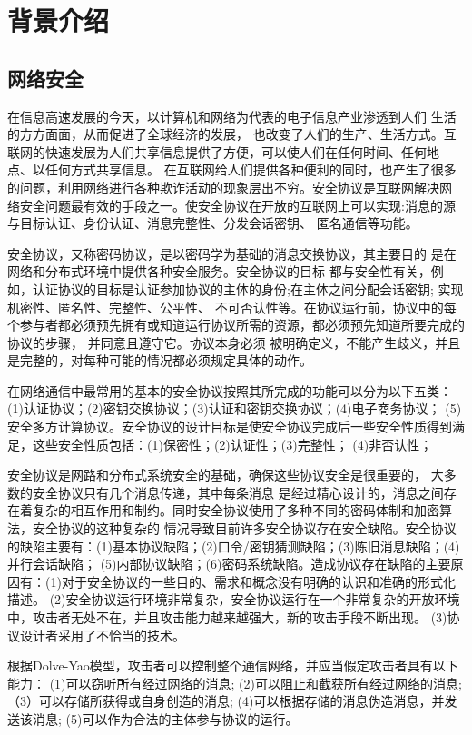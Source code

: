 \documentclass[UTF8]{ctexart}
\begin{document}
\section{背景介绍}
\subsection{网络安全}
\par{
	在信息高速发展的今天，以计算机和网络为代表的电子信息产业渗透到人们 生活的方方面面，从而促进了全球经济的发展，
也改变了人们的生产、生活方式。互联网的快速发展为人们共享信息提供了方便，可以使人们在任何时间、任何地 点、以任何方式共享信息。
在互联网给人们提供各种便利的同时，也产生了很多的问题，利用网络进行各种欺诈活动的现象层出不穷。安全协议是互联网解决网
络安全问题最有效的手段之一。使安全协议在开放的互联网上可以实现:消息的源与目标认证、身份认证、消息完整性、分发会话密钥、
匿名通信等功能。
}
\par{
	安全协议，又称密码协议，是以密码学为基础的消息交换协议，其主要目的 是在网络和分布式环境中提供各种安全服务。安全协议的目标
	都与安全性有关，例如，认证协议的目标是认证参加协议的主体的身份;在主体之间分配会话密钥; 实现机密性、匿名性、完整性、公平性、
	不可否认性等。在协议运行前，协议中的每个参与者都必须预先拥有或知道运行协议所需的资源，都必须预先知道所要完成的协议的步骤，
	并同意且遵守它。协议本身必须 被明确定义，不能产生歧义，并且是完整的，对每种可能的情况都必须规定具体的动作。
}
\par{
	在网络通信中最常用的基本的安全协议按照其所完成的功能可以分为以下五类：(1)认证协议；(2)密钥交换协议；(3)认证和密钥交换协议；(4)电子商务协议；
	(5)安全多方计算协议。安全协议的设计目标是使安全协议完成后一些安全性质得到满足，这些安全性质包括：(1)保密性；(2)认证性；(3)完整性；
	(4)非否认性；
}
\par{安全协议是网路和分布式系统安全的基础，确保这些协议安全是很重要的， 大多数的安全协议只有几个消息传递，其中每条消息
	是经过精心设计的，消息之间存在着复杂的相互作用和制约。同时安全协议使用了多种不同的密码体制和加密算法，安全协议的这种复杂的
	情况导致目前许多安全协议存在安全缺陷。安全协议的缺陷主要有：(1)基本协议缺陷；(2)口令/密钥猜测缺陷；(3)陈旧消息缺陷；(4)并行会话缺陷；
	(5)内部协议缺陷；(6)密码系统缺陷。造成协议存在缺陷的主要原因有：(1)对于安全协议的一些目的、需求和概念没有明确的认识和准确的形式化描述。
	(2)安全协议运行环境非常复杂，安全协议运行在一个非常复杂的开放环境中，攻击者无处不在，并且攻击能力越来越强大，新的攻击手段不断出现。
	(3)协议设计者采用了不恰当的技术。
}
\par{
	根据Dolve-Yao模型，攻击者可以控制整个通信网络，并应当假定攻击者具有以下能力：
	(1)可以窃听所有经过网络的消息; (2)可以阻止和截获所有经过网络的消息; （3）可以存储所获得或自身创造的消息; 
	(4)可以根据存储的消息伪造消息，并发送该消息; (5)可以作为合法的主体参与协议的运行。
}
\end{document}
